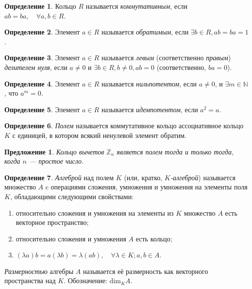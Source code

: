 \documentclass[a4paper]{article}
\theoremstyle{plain}
\newtheorem{proposal}{Предложение}
\theoremstyle{definition}
\newtheorem{definition}{Определение}
\numberwithin{definition}{section}
\numberwithin{proposal}{section}
\begin{document}
\begin{definition}
Кольцо \(R\) называется \emph{коммутативным}, если \(ab = ba, \quad \forall a, b \in R\).
\end{definition}

\begin{definition}
Элемент \(a \in R\) называется \emph{обратимым}, если \(\exists b \in R, ab = ba = 1\). 
\end{definition}

\begin{definition}
Элемент \(a \in R\) называется \emph{левым} (соответственно \emph{правым}) \emph{делителем нуля}, если \(a \neq 0\) и \(\exists b \in R, b \neq 0, ab = 0\) (соответственно, \(ba = 0\)).
\end{definition}

\begin{definition}
Элемент \(a \in R\) называется \emph{нильпотентом}, если \(a \neq 0\), и \(\exists m \in \mathbb{N}\), что \(a^m = 0\).
\end{definition}

\begin{definition}
Элемент \(a \in R\) называется \emph{идемпотентом}, если \(a^2 = a\).
\end{definition}

\begin{definition}
\emph{Полем} называется коммутативное кольцо ассоциативное кольцо \(K\) с единицей, в котором всякий ненулевой элемент обратим.
\end{definition}

\begin{proposal}
Кольцо вычетов \(\mathbb{Z}_n\) является полем тогда и только тогда, когда \(n\) --- простое число.
\end{proposal}

\begin{definition}
\emph{Алгеброй} над полем \(K\) (или, кратко, \emph{\(K\)-алгеброй}) называется множество \(A\) c операциями сложения, умножения и умножения на элементы поля \(K\), обладающими следующими свойствами:
\begin{enumerate}
	\item относительно сложения и умножения на элементы из \(K\) множество \(A\) есть векторное пространство;
	\item относительно сложения и умножения \(A\) есть кольцо;
	\item \((\lambda{}a)b = a(\lambda{}b) = \lambda(ab), \quad \forall \lambda \in K; a,b \in A\).
\end{enumerate}

\emph{Размерностью} алгебры \(A\) называется её размерность как векторного пространства над \(K\). Обозначение: \(\mathrm{dim}_K A\).
\end{definition}
\end{document}
